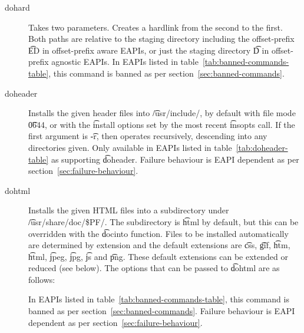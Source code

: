 \begin{description}
\item[dohard] Takes two parameters. Creates a hardlink from the second to the first. Both paths are
    relative to the staging directory including the offset-prefix \t{ED} in offset-prefix aware
    EAPIs, or just the staging directory \t{D} in offset-prefix agnostic EAPIs. In EAPIs listed
    in table~\ref{tab:banned-commands-table}, this command is banned as per
    section~\ref{sec:banned-commands}.

\item[doheader]  Installs the given header files into \t{/usr/include/},
    by default with file mode \t{0644}, or with the \t{install} options set by the most recent
    \t{insopts} call. If the first argument is \t{-r}, then operates recursively, descending
    into any directories given.
    Only available in EAPIs listed in table~\ref{tab:doheader-table} as supporting \t{doheader}.
    Failure behaviour is EAPI dependent as per section~\ref{sec:failure-behaviour}.

\item[dohtml] Installs the given HTML files into a subdirectory under \t{/usr/share/doc/\$PF/}.
    The subdirectory is \t{html} by default, but this can be overridden with the \t{docinto}
    function. Files to be installed automatically are determined by extension and the default
    extensions are \t{css}, \t{gif}, \t{htm}, \t{html}, \t{jpeg}, \t{jpg}, \t{js} and \t{png}.
    These default extensions can be extended or reduced (see below). The options that can be passed
    to \t{dohtml} are as follows:

    In EAPIs listed in table~\ref{tab:banned-commands-table}, this command is banned as per
    section~\ref{sec:banned-commands}.
    Failure behaviour is EAPI dependent as per section~\ref{sec:failure-behaviour}.


\end{description}
